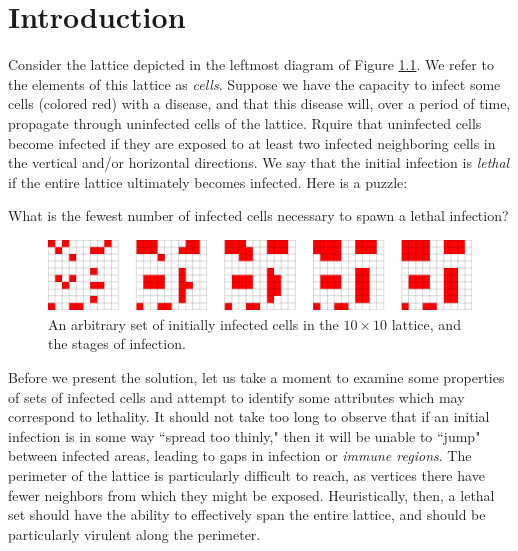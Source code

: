 \chapter{Introduction}

Consider the lattice depicted in the leftmost diagram of Figure \ref{fig:simple_puzzle}. We refer to the elements of this lattice as \emph{cells}. Suppose we have the capacity to infect some cells (colored red) with a disease, and that this disease will, over a period of time, propagate through uninfected cells of the lattice. Rquire that uninfected cells become infected if they are exposed to at least two infected neighboring cells in the vertical and/or horizontal directions. We say that the initial infection is \emph{lethal} if the entire lattice ultimately becomes infected. Here is a puzzle:

\begin{question}
\label{que:simple_puzzle}
What is the fewest number of infected cells necessary to spawn a lethal infection?
\end{question}

\begin{figure}[]
\centering
\includegraphics[width=\textwidth]{figures/1/simple_puzzle.pdf}
\caption{An arbitrary set of initially infected cells in the $10 \times 10$ lattice, and the stages of infection.}
\label{fig:simple_puzzle}
\end{figure} 

Before we present the solution,
let us take a moment to examine some properties of sets of infected cells and attempt to identify some attributes which may correspond to lethality. It should not take too long to observe that if an initial infection is in some way ``spread too thinly," then it will be unable to ``jump" between infected areas, leading to gaps in infection or \emph{immune regions}. The perimeter of the lattice is particularly difficult to reach, as vertices there have fewer neighbors from which they might be exposed. Heuristically, then, a lethal set should have the ability to effectively span the entire lattice, and should be particularly virulent along the perimeter. 

